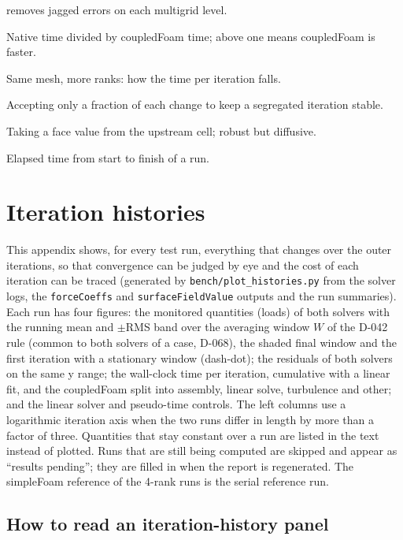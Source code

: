 \documentclass[11pt,a4paper]{article}
\newcommand{\code}[1]{\texttt{#1}}
\begin{document}
\begin{description}
  removes jagged errors on each multigrid level.
\item[Speed-up.] Native time divided by coupledFoam time; above one means
  coupledFoam is faster.
\item[Strong scaling.] Same mesh, more ranks: how the time per iteration
  falls.
\item[Under-relaxation.] Accepting only a fraction of each change to keep a
  segregated iteration stable.
\item[Upwind.] Taking a face value from the upstream cell; robust but
  diffusive.
\item[Wall-clock time.] Elapsed time from start to finish of a run.
\end{description}

\clearpage
\appendix
\section{Iteration histories}\label{app:histories}

This appendix shows, for every test run, everything that changes over the
outer iterations, so that convergence can be judged by eye and the cost of
each iteration can be traced (generated by \code{bench/plot\_histories.py}
from the solver logs, the \code{forceCoeffs} and \code{surfaceFieldValue}
outputs and the run summaries). Each run has four figures: the monitored
quantities (loads) of both solvers with the running mean and $\pm$RMS band
over the averaging window $W$ of the D-042 rule (common to both solvers of
a case, D-068), the shaded
final window and the first iteration with a stationary window (dash-dot);
the residuals of both solvers on the same y range; the wall-clock time per
iteration, cumulative with a linear fit, and the coupledFoam split into
assembly, linear solve, turbulence and other; and the linear solver and
pseudo-time controls. The left columns use a logarithmic iteration axis when
the two runs differ in length by more than a factor of three. Quantities
that stay constant over a run are listed in the text instead of plotted.
Runs that are still being computed are skipped and appear as ``results
pending''; they are filled in when the report is regenerated. The simpleFoam
reference of the 4-rank runs is the serial reference run.

\subsection*{How to read an iteration-history panel}
\end{document}
